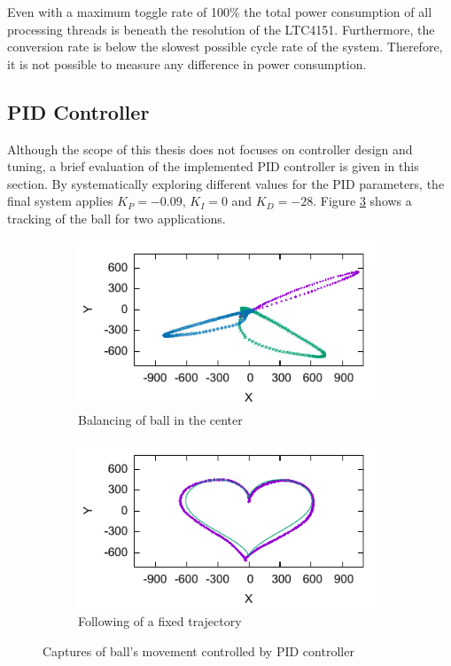 Even with a maximum toggle rate of 100\% the total power consumption of all
processing threads is beneath the resolution of the LTC4151. Furthermore, the
conversion rate is below the slowest possible cycle rate of the system.
Therefore, it is not possible to measure any difference in power consumption.

\subsection{\acs{PID} Controller}
Although the scope of this thesis does not focuses on controller design and
tuning, a brief evaluation of the implemented \ac{PID} controller is given in
this section. By systematically exploring different values for the
\ac{PID} parameters, the final system applies $K_P = -0.09$, $K_I = 0$ and
$K_D = -28$. Figure \ref{fig:demo_pid} shows a tracking of the ball for two
applications.
\begin{figure}
	\centering
	\begin{subfigure}{0.49\textwidth}
		\centering
		\includegraphics[width=\textwidth]{../figures/eval_pos}
		\caption{Balancing of ball in the center}
		\label{fig:eval_pos}
	\end{subfigure}
	\begin{subfigure}{0.49\textwidth}
		\centering
		\includegraphics[width=\textwidth]{../figures/eval_traj}
		\caption{Following of a fixed trajectory}
		\label{fig:eval_traj}
	\end{subfigure}
	\caption{Captures of ball's movement controlled by \acs{PID} controller}
	\label{fig:demo_pid}
\end{figure}
